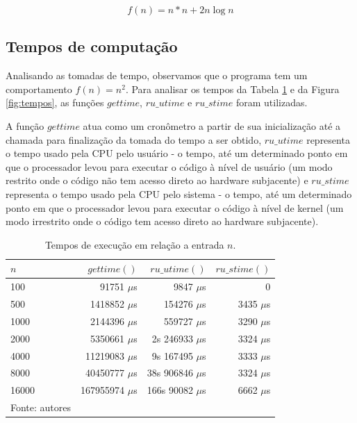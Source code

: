 \documentclass[12pt,a4paper]{article}
\begin{document}
\[f(n)= n * n + 2n \log n\] 

\subsection{Tempos de computação}

Analisando as tomadas de tempo, observamos que o programa tem um comportamento $f(n) = n^2$. Para analisar os tempos da Tabela \ref{tab:tempos} e da Figura \ref{fig:tempos}, as funções $gettime$, $ru\_utime$ e $ru\_stime$ foram utilizadas.

A função $gettime$ atua como um cronômetro a partir de sua inicialização até a chamada para finalização da tomada do tempo a ser obtido, $ru\_utime$ representa o tempo usado pela CPU pelo usuário - o tempo, até um determinado ponto em que o processador levou para executar o código à nível de usuário (um modo restrito onde o código não tem acesso direto ao hardware subjacente) e $ru\_stime$ representa o tempo usado pela CPU pelo sistema - o tempo, até um determinado ponto em que o processador levou para executar o código à nível de kernel (um modo irrestrito onde o código tem acesso direto ao hardware subjacente).

\begin{table}[!h]
	\centering
	\caption{Tempos de execução em relação a entrada $n$.}
	\label{tab:tempos}
	\begin{tabular}{lrrr}
		\toprule 
		$n$ & $gettime()$ & $ru\_utime()$ & $ru\_stime()$ \\ 
		\midrule
		100 & 91751 $\mu$s & 9847 $\mu$s & 0 \\
		500 & 1418852 $\mu$s & 154276 $\mu$s & 3435 $\mu$s \\
		1000 & 2144396 $\mu$s & 559727 $\mu$s & 3290 $\mu$s \\
		2000 & 5350661 $\mu$s & 2s 246933 $\mu$s & 3324 $\mu$s \\
		4000 & 11219083 $\mu$s & 9s 167495 $\mu$s & 3333 $\mu$s \\
		8000 & 40450777 $\mu$s & 38s 906846 $\mu$s & 3324 $\mu$s \\
		16000 & 167955974 $\mu$s & 166s 90082 $\mu$s & 6662 $\mu$s \\
		\bottomrule
		\footnotesize Fonte: autores
	\end{tabular}
\end{table}
\end{document}

